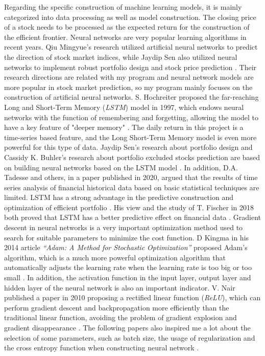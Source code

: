 \documentclass[default,iicol]{sn-jnl}%
\begin{document}
Regarding the specific construction of machine learning models, it is mainly categorized into data processing as well as model construction. The closing price of a stock needs to be processed as the expected return for the construction of the efficient frontier. Neural networks are very popular learning algorithms in recent years. Qiu Mingyue's research utilized artificial neural networks to predict the direction of stock market indices, while Jaydip Sen also utilized neural networks to implement robust portfolio design and stock price prediction \cite{2016Application,2022Robust}. Their research directions are related with my program and neural network models are more popular in stock market prediction, so my program mainly focuses on the construction of artificial neural networks. S. Hochreiter proposed the far-reaching Long and Short-Term Memory (\textit{LSTM}) model in 1997, which endows neural networks with the function of remembering and forgetting, allowing the model to have a key feature of "deeper memory" \cite{1997Long}. The daily return in this project is a time-series based feature, and the Long Short-Term Memory model is even more powerful for this type of data. Jaydip Sen's research about portfolio design and Cassidy K. Buhler's research about portfolio excluded stocks prediction are based on building neural networks based on the LSTM model \cite{2022Robust,buhler2023efficient}. In addition, D.A. Tadesse and others, in a paper published in 2020, argued that the results of time series analysis of financial historical data based on basic statistical techniques are limited. LSTM has a strong advantage in the predictive construction and optimization of efficient portfolio \cite{2020Portfolio}. His view and the study of T. Fischer in 2018 both proved that LSTM has a better predictive effect on financial data \cite{2018Deep}. Gradient descent in neural networks is a very important optimization method used to search for suitable parameters to minimize the cost function. D Kingma in his 2014 article \textit{“Adam: A Method for Stochastic Optimization”} proposed Adam's algorithm, which is a much more powerful optimization algorithm that automatically adjusts the learning rate when the learning rate is too big or too small \cite{2014Adam}. In addition, the activation function in the input layer, output layer and hidden layer of the neural network is also an important indicator. V. Nair published a paper in 2010 proposing a rectified linear function (\textit{ReLU}), which can perform gradient descent and backpropagation more efficiently than the traditional linear function, avoiding the problem of gradient explosion and gradient disappearance \cite{2010Rectified}. The following papers also inspired me a lot about the selection of some parameters, such as batch size, the usage of regularization and the cross entropy function when constructing neural network \cite{smith2018dont,2009L2,2005A}.
\end{document}
